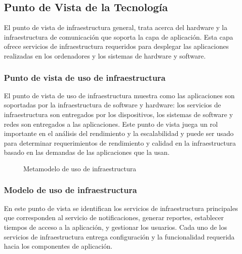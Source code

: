 \subsection{Punto de Vista de la Tecnología}
El punto de vista de infraestructura general, trata acerca del hardware y la infraestructura de comunicación que soporta la capa de aplicación. Esta capa ofrece servicios de infraestructura requeridos para desplegar las aplicaciones realizadas en los ordenadores y los sistemas de
hardware y software.



\subsubsection{Punto de vista de uso de infraestructura}

El punto de vista de uso de infraestructura muestra como las aplicaciones son soportadas por la infraestructura de software y hardware: los servicios de infraestructura son entregados por los dispositivos, los sistemas de software y redes son entregados a las aplicaciones. Este
punto de vista juega un rol importante en el análisis del rendimiento y la escalabilidad y puede ser usado para determinar requerimientos de rendimiento y calidad en la infraestructura basado en las demandas de las aplicaciones que la usan.
\newpage

\begin{figure}[h]
	\centering
	\caption{Metamodelo de uso de infraestructura}
\end{figure}

\subsubsection{Modelo de uso de infraestructura}

En este punto de vista se identifican los servicios de infraestructura principales que corresponden al servicio de notificaciones, generar reportes, establecer tiempos de acceso a la
aplicación, y gestionar los usuarios. Cada uno de los servicios de infraestructura entrega configuración y la funcionalidad requerida hacia los componentes de aplicación.


